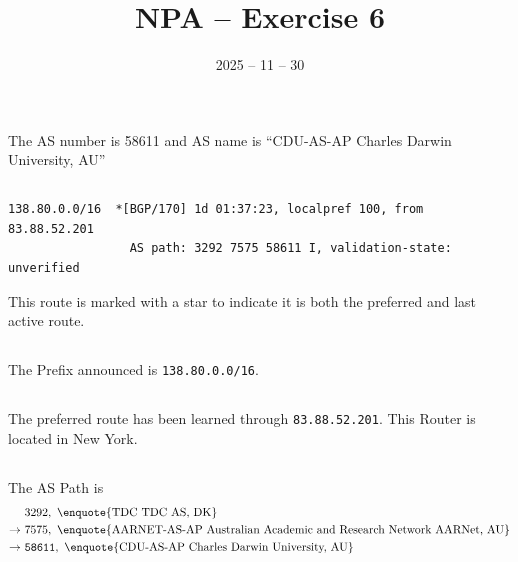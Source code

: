 \documentclass{article}
\date{2025 -- 11 -- 30}
\title{NPA -- Exercise 6}
\begin{document}
\maketitle
    
    \section{}
    \subsection{}
    The AS number is 58611 and AS name is \enquote{CDU-AS-AP Charles Darwin University, AU}
    
    \subsection{}
    \begin{verbatim}
138.80.0.0/16  *[BGP/170] 1d 01:37:23, localpref 100, from 83.88.52.201
                 AS path: 3292 7575 58611 I, validation-state: unverified
    \end{verbatim}
    This route is marked with a star to indicate it is both the preferred and last active route.

    
    \subsection{}
    The Prefix announced is \texttt{138.80.0.0/16}.
    
    \subsection{}
    The preferred route has been learned through \texttt{83.88.52.201}. This Router is located in New York. 
    
    \subsection{}
    The AS Path is
    \begin{align*}
        &3292,\ \text{\enquote{TDC TDC AS, DK}}\\
        \to\ & 7575,\ \text{\enquote{AARNET-AS-AP Australian Academic and Research Network AARNet, AU}}\\
        \to\ &  \texttt{58611},\ \text{\enquote{CDU-AS-AP Charles Darwin University, AU}}
    \end{align*}
    
\end{document}
